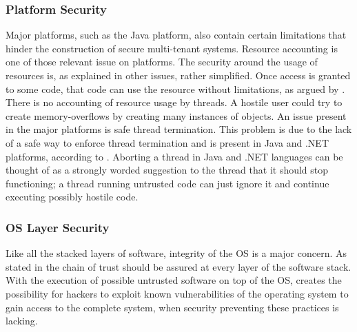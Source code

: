 {{\subsubsection{Platform Security}
Major platforms, such as the Java platform, also contain certain limitations that hinder the construction of secure multi-tenant systems. Resource accounting is one of those relevant issue on platforms. The security around the usage of resources is, as explained in other issues, rather simplified. Once access is granted to some code, that code can use the resource without limitations, as argued by \cite{Merino2011Security}. There is no accounting of resource usage by threads. A hostile user could try to create memory-overflows by creating many instances of objects.
An issue present in the major platforms is safe thread termination. This problem is due to the lack of a safe way to enforce thread termination and is present in Java and .NET platforms, according to \cite{Merino2011Security}. Aborting a thread in Java and .NET languages can be thought of as a strongly worded suggestion to the thread that it should stop functioning; a thread running untrusted code can just ignore it and continue executing possibly hostile code.\\

\subsubsection{OS Layer Security}
Like all the stacked layers of software, integrity of the OS is a major concern. As stated in \cite{Takahashi2012Security} the chain of trust should be assured at every layer of the software stack. With the execution of possible untrusted software on top of the OS, creates the possibility for hackers to exploit known vulnerabilities of the operating system to gain access to the complete system, when security preventing these practices is lacking.\\


}}
